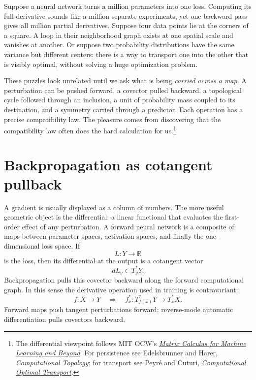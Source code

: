 

Suppose a neural network turns a million parameters into one loss. Computing its full derivative sounds like a million separate experiments, yet one backward pass gives all million partial derivatives. Suppose four data points lie at the corners of a square. A loop in their neighborhood graph exists at one spatial scale and vanishes at another. Or suppose two probability distributions have the same variance but different centers: there is a way to transport one into the other that is visibly optimal, without solving a huge optimization problem.

These puzzles look unrelated until we ask what is being \emph{carried across a map}. A perturbation can be pushed forward, a covector pulled backward, a topological cycle followed through an inclusion, a unit of probability mass coupled to its destination, and a symmetry carried through a predictor. Each operation has a precise compatibility law. The pleasure comes from discovering that the compatibility law often does the hard calculation for us.\footnote{The differential viewpoint follows MIT OCW's \href{https://ocw.mit.edu/courses/18-s096-matrix-calculus-for-machine-learning-and-beyond-january-iap-2023/pages/lecture-notes-and-readings/}{\emph{Matrix Calculus for Machine Learning and Beyond}}. For persistence see Edelsbrunner and Harer, \emph{Computational Topology}; for transport see Peyr\'e and Cuturi, \href{https://optimaltransport.github.io/book/}{\emph{Computational Optimal Transport}}.}

\section{Backpropagation as cotangent pullback}

A gradient is usually displayed as a column of numbers. The more useful geometric object is the differential: a linear functional that evaluates the first-order effect of any perturbation.  A forward neural network is a composite of maps between parameter spaces, activation spaces, and finally the one-dimensional loss space.  If
\[
  L:Y\to \mathbb R
\]
is the loss, then its differential at the output is a cotangent vector
\[
  dL_y\in T_y^*Y.
\]
Backpropagation pulls this covector backward along the forward computational graph.  In this sense the derivative operation used in training is contravariant:
\[
  f:X\to Y
  \quad\Longrightarrow\quad
  f_x^*:T_{f(x)}^*Y\to T_x^*X.
\]
Forward maps push tangent perturbations forward; reverse-mode automatic differentiation pulls covectors backward.

